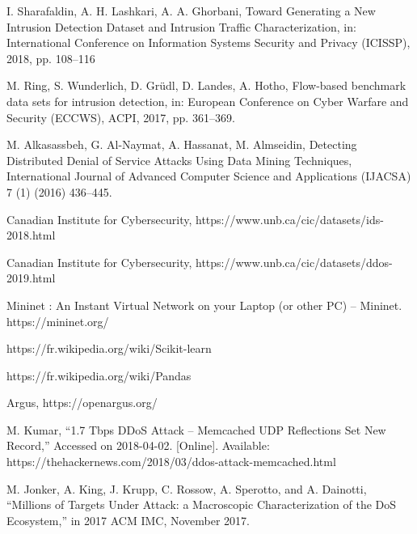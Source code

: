 \begin{thebibliography}{9}
\bibitem{}
I. Sharafaldin, A. H. Lashkari, A. A. Ghorbani, Toward Generating a New Intrusion Detection Dataset and Intrusion Traffic Characterization, in: International Conference on Information Systems Security and Privacy (ICISSP), 2018, pp. 108–116

\bibitem{}
M. Ring, S. Wunderlich, D. Grüdl, D. Landes, A. Hotho, Flow-based benchmark data sets for intrusion detection, in: European Conference on Cyber Warfare and Security (ECCWS), ACPI, 2017, pp. 361–369.

\bibitem{}
M. Alkasassbeh, G. Al-Naymat, A. Hassanat, M. Almseidin, Detecting Distributed Denial of Service Attacks Using Data Mining Techniques, International Journal of Advanced Computer Science and Applications (IJACSA) 7 (1) (2016) 436–445.

\bibitem{}
Canadian Institute for Cybersecurity, https://www.unb.ca/cic/datasets/ids-2018.html

\bibitem{}
Canadian Institute for Cybersecurity, https://www.unb.ca/cic/datasets/ddos-2019.html

\bibitem{}
Mininet : An Instant Virtual Network on your Laptop (or other PC) – Mininet. https://mininet.org/

\bibitem{}
https://fr.wikipedia.org/wiki/Scikit-learn

\bibitem{}
https://fr.wikipedia.org/wiki/Pandas

\bibitem{}
Argus, https://openargus.org/

\bibitem{}
M. Kumar, “1.7 Tbps DDoS Attack – Memcached UDP Reflections Set New Record,” Accessed on 2018-04-02. [Online]. Available: https://thehackernews.com/2018/03/ddos-attack-memcached.html

\bibitem{}
M. Jonker, A. King, J. Krupp, C. Rossow, A. Sperotto, and A. Dainotti, “Millions of Targets Under Attack: a Macroscopic Characterization of the DoS Ecosystem,” in 2017 ACM IMC, November 2017.
\end{thebibliography}
